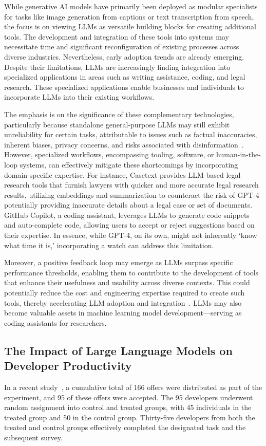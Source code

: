 \documentclass[12pt]{extarticle}
\begin{document}
While generative AI models have primarily been deployed as modular specialists for tasks like image generation from captions or text transcription from speech, the focus is on viewing LLMs as versatile building blocks for creating additional tools. The development and integration of these tools into systems may necessitate time and significant reconfiguration of existing processes across diverse industries. Nevertheless, early adoption trends are already emerging. Despite their limitations, LLMs are increasingly finding integration into specialized applications in areas such as writing assistance, coding, and legal research. These specialized applications enable businesses and individuals to incorporate LLMs into their existing workflows.

The emphasis is on the significance of these complementary technologies, particularly because standalone general-purpose LLMs may still exhibit unreliability for certain tasks, attributable to issues such as factual inaccuracies, inherent biases, privacy concerns, and risks associated with disinformation~\cite{abid2021persistent, schramowski2022large, goldstein2023generative}. However, specialized workflows, encompassing tooling, software, or human-in-the-loop systems, can effectively mitigate these shortcomings by incorporating domain-specific expertise. For instance, Casetext provides LLM-based legal research tools that furnish lawyers with quicker and more accurate legal research results, utilizing embeddings and summarization to counteract the risk of GPT-4 potentially providing inaccurate details about a legal case or set of documents. GitHub Copilot, a coding assistant, leverages LLMs to generate code snippets and auto-complete code, allowing users to accept or reject suggestions based on their expertise. In essence, while GPT-4, on its own, might not inherently `know what time it is,' incorporating a watch can address this limitation.

Moreover, a positive feedback loop may emerge as LLMs surpass specific performance thresholds, enabling them to contribute to the development of tools that enhance their usefulness and usability across diverse contexts. This could potentially reduce the cost and engineering expertise required to create such tools, thereby accelerating LLM adoption and integration~\cite{chen2021evaluating, peng2023impact}. LLMs may also become valuable assets in machine learning model development—serving as coding assistants for researchers.

\subsection{The Impact of Large Language Models on Developer Productivity}
In a recent study~\cite{peng2023impact}, a cumulative total of 166 offers were distributed as part of the experiment, and 95 of these offers were accepted. The 95 developers underwent random assignment into control and treated groups, with 45 individuals in the treated group and 50 in the control group. Thirty-five developers from both the treated and control groups effectively completed the designated task and the subsequent survey.
\end{document}
